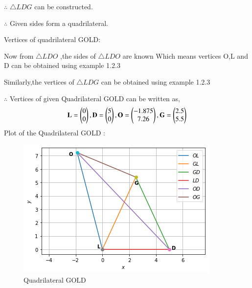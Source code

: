 \documentclass[journal,12pt,twocolumn]{IEEEtran}
\begin{document}
\begin{enumerate}
$\therefore$ $\triangle LDG$ can be constructed.

$\therefore$ Given sides form a quadrilateral.

Vertices of quadrilateral GOLD:

Now from $\triangle LDO$ ,the sides of $\triangle LDO$ are known Which means vertices O,L and D can be obtained using example 1.2.3

Similarly,the vertices of $\triangle LDG$ can be obtained using example 1.2.3

$\therefore$ Vertices of given Quadrilateral GOLD can be written as,
\begin{align}
\mathbf{L}=\begin{pmatrix}0\\0\end{pmatrix},\mathbf{D} = \begin{pmatrix}5\\0\end{pmatrix}, \mathbf{O}=\begin{pmatrix}-1.875\\7.26\end{pmatrix},\mathbf{G}=\begin{pmatrix}2.5\\5.5\end{pmatrix}
\end{align}
Plot of the Quadrilateral GOLD :
\begin{figure}[ht]
    \centering
    \includegraphics[width=\columnwidth]{GOLDfig.png}
    \caption{Quadrilateral GOLD}
    \label{fig:Quadrilateral GOLD}
\end{figure}
\end{enumerate}
\end{document}
